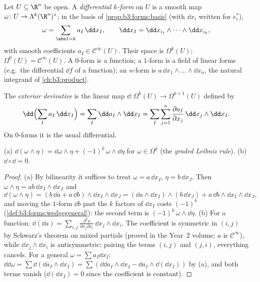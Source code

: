 \begin{definition}\label{def:b3:forms:diffform}
Let $U \subseteq \R^n$ be open. A \emph{differential
$k$-form} on $U$ is a smooth map
$\omega\colon U \to \Lambda^k(\R^n)^*$; in the basis of
\cref{prop:b3:forms:basis} (with $\dd x_i$ written for
$e_i^*$),
\[
\omega = \sum_{\abs I = k} a_I\,\dd x_I,
\qquad
\dd x_I = \dd x_{i_1} \wedge \dots \wedge \dd x_{i_k},
\]
with smooth coefficients $a_I \in \mathcal C^\infty(U)$.
Their space is $\Omega^k(U)$; $\Omega^0(U) = \mathcal
C^\infty(U)$. A $0$-form is a function; a $1$-form is a field
of linear forms (e.g.\ the differential $\dd f$ of a
function); an $n$-form is $a\,\dd x_1\wedge\dots\wedge\dd
x_n$, the natural integrand of \cref{ch:b3:product}.
\end{definition}

\begin{definition}\label{def:b3:forms:d}
The \emph{exterior derivative} is
the linear map $\dd\colon \Omega^k(U) \to \Omega^{k+1}(U)$
defined by
\[
\dd\Bigl(\sum_I a_I\,\dd x_I\Bigr)
= \sum_I \dd a_I \wedge \dd x_I
= \sum_I\sum_{j=1}^n \frac{\partial a_I}{\partial
x_j}\,\dd x_j \wedge \dd x_I .
\]
On $0$-forms it is the usual differential.
\end{definition}

\begin{theorem}\label{thm:b3:forms:dsquare}
(a) $\dd(\omega \wedge \eta) = \dd\omega \wedge \eta +
(-1)^k\,\omega \wedge \dd\eta$ for $\omega \in \Omega^k$
(the \emph{graded Leibniz rule}).
(b) $\dd \circ \dd = 0$.
\end{theorem}

\begin{proof}
(a) By bilinearity it suffices to treat $\omega = a\,\dd
x_I$, $\eta = b\,\dd x_J$. Then $\omega \wedge \eta =
ab\,\dd x_I \wedge \dd x_J$ and
\[
\dd(\omega\wedge\eta) = (b\,\dd a + a\,\dd b) \wedge \dd x_I
\wedge \dd x_J
= (\dd a \wedge \dd x_I) \wedge (b\,\dd x_J) +
a\,\dd b \wedge \dd x_I \wedge \dd x_J,
\]
and moving the $1$-form $\dd b$ past the $k$ factors of $\dd
x_I$ costs $(-1)^k$ (\cref{def:b3:forms:wedgegeneral}): the
second term is $(-1)^k\,\omega \wedge \dd\eta$.
(b) For a function: $\dd(\dd a) = \sum_{i,j}
\frac{\partial^2a}{\partial x_j\partial x_i}\,\dd x_j \wedge
\dd x_i$. The coefficient is symmetric in $(i,j)$ by
Schwarz's theorem on mixed partials (proved in the Year~2
volume; $a$ is $\mathcal C^\infty$), while $\dd x_j \wedge
\dd x_i$ is antisymmetric: pairing the terms $(i,j)$ and
$(j,i)$, everything cancels. For a general $\omega = \sum
a_I\dd x_I$: $\dd\dd\omega = \sum\dd(\dd a_I \wedge \dd x_I)
= \sum(\dd\dd a_I\wedge\dd x_I - \dd a_I\wedge\dd(\dd x_I))$
by (a), and both terms vanish ($\dd(\dd x_I) = 0$ since the
coefficient is constant).
\end{proof}

